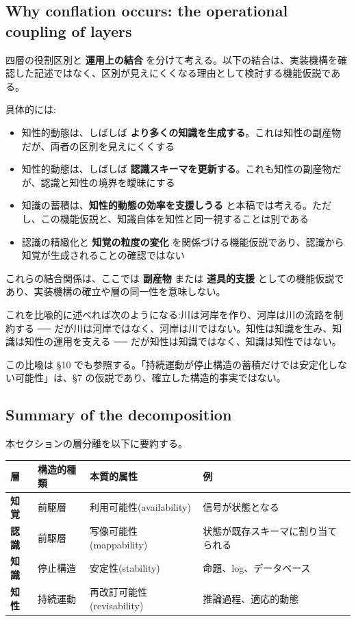 \subsection{Why conflation occurs: the operational coupling of layers}


四層の役割区別と \textbf{運用上の結合} を分けて考える。以下の結合は、実装機構を確認した記述ではなく、区別が見えにくくなる理由として検討する機能仮説である。

具体的には:

\begin{itemize}
\item 知性的動態は、しばしば \textbf{より多くの知識を生成する}。これは知性の副産物だが、両者の区別を見えにくくする
\item 知性的動態は、しばしば \textbf{認識スキーマを更新する}。これも知性の副産物だが、認識と知性の境界を曖昧にする
\item 知識の蓄積は、\textbf{知性的動態の効率を支援しうる} と本稿では考える。ただし、この機能仮説と、知識自体を知性と同一視することは別である
\item 認識の精緻化と \textbf{知覚の粒度の変化} を関係づける機能仮説であり、認識から知覚が生成されることの確認ではない
\end{itemize}

これらの結合関係は、ここでは \textbf{副産物} または \textbf{道具的支援} としての機能仮説であり、実装機構の確立や層の同一性を意味しない。

これを比喩的に述べれば次のようになる:川は河岸を作り、河岸は川の流路を制約する ── だが川は河岸ではなく、河岸は川ではない。知性は知識を生み、知識は知性の運用を支える ── だが知性は知識ではなく、知識は知性ではない。

この比喩は \S{}10 でも参照する。「持続運動が停止構造の蓄積だけでは安定化しない可能性」は、\S{}7 の仮説であり、確立した構造的事実ではない。

\subsection{Summary of the decomposition}


本セクションの層分離を以下に要約する。

\begin{table}[H]
\centering
\small
\begin{tabularx}{\textwidth}{>{\raggedright\arraybackslash}X>{\raggedright\arraybackslash}X>{\raggedright\arraybackslash}X>{\raggedright\arraybackslash}X}
\toprule
層 & 構造的種類 & 本質的属性 & 例 \\
\midrule
\textbf{知覚} & 前駆層 & 利用可能性(availability) & 信号が状態となる \\
\textbf{認識} & 前駆層 & 写像可能性(mappability) & 状態が既存スキーマに割り当てられる \\
\textbf{知識} & 停止構造 & 安定性(stability) & 命題、log、データベース \\
\textbf{知性} & 持続運動 & 再改訂可能性(revisability) & 推論過程、適応的動態 \\
\bottomrule
\end{tabularx}
\end{table}


